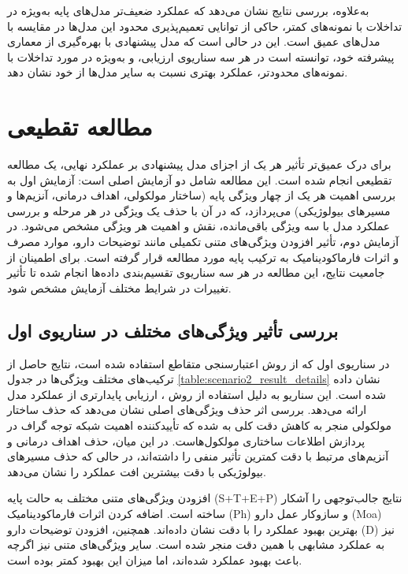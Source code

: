 به‌علاوه، بررسی نتایج نشان می‌دهد که عملکرد ضعیف‌تر مدل‌های پایه به‌ویژه در تداخلات با نمونه‌های کمتر، حاکی از توانایی تعمیم‌پذیری محدود این مدل‌ها در مقایسه با مدل‌های عمیق است. این در حالی است که مدل پیشنهادی با بهره‌گیری از معماری پیشرفته خود، توانسته است در هر سه سناریوی ارزیابی، و به‌ویژه در مورد تداخلات با نمونه‌های محدودتر، عملکرد بهتری نسبت به سایر مدل‌ها از خود نشان دهد.

\section{مطالعه تقطیعی}

برای درک عمیق‌تر تأثیر هر یک از اجزای مدل پیشنهادی بر عملکرد نهایی، یک مطالعه تقطیعی انجام شده است. این مطالعه شامل دو آزمایش اصلی است: آزمایش اول به بررسی اهمیت هر یک از چهار ویژگی پایه (ساختار مولکولی، اهداف درمانی، آنزیم‌ها و مسیرهای بیولوژیکی) می‌پردازد، که در آن با حذف یک ویژگی در هر مرحله و بررسی عملکرد مدل با سه ویژگی باقی‌مانده، نقش و اهمیت هر ویژگی مشخص می‌شود. در آزمایش دوم، تأثیر افزودن ویژگی‌های متنی تکمیلی مانند توضیحات دارو، موارد مصرف و اثرات فارماکودینامیک به ترکیب پایه مورد مطالعه قرار گرفته است. برای اطمینان از جامعیت نتایج، این مطالعه در هر سه سناریوی تقسیم‌بندی داده‌ها انجام شده تا تأثیر تغییرات در شرایط مختلف آزمایش مشخص شود.


\subsection{بررسی تأثیر ویژگی‌های مختلف در سناریوی اول}

در سناریوی اول که از روش اعتبارسنجی متقاطع  استفاده شده است، نتایج حاصل از ترکیب‌های مختلف ویژگی‌ها در جدول \ref{table:scenario2_result_details} نشان داده شده است. این سناریو به دلیل استفاده از روش ، ارزیابی پایدارتری از عملکرد مدل ارائه می‌دهد. بررسی اثر حذف ویژگی‌های اصلی نشان می‌دهد که حذف ساختار مولکولی منجر به کاهش دقت کلی به  شده که تأییدکننده اهمیت شبکه توجه گراف در پردازش اطلاعات ساختاری مولکول‌هاست. در این میان، حذف اهداف درمانی و آنزیم‌های مرتبط با دقت  کمترین تأثیر منفی را داشته‌اند، در حالی که حذف مسیرهای بیولوژیکی با دقت  بیشترین افت عملکرد را نشان می‌دهد.

افزودن ویژگی‌های متنی مختلف به حالت پایه (S+T+E+P) نتایج جالب‌توجهی را آشکار ساخته است. اضافه کردن اثرات فارماکودینامیک (Ph) و سازوکار عمل دارو (Moa) بهترین بهبود عملکرد را با دقت  نشان داده‌اند. همچنین، افزودن توضیحات دارو (D) نیز به عملکرد مشابهی با همین دقت منجر شده است. سایر ویژگی‌های متنی نیز اگرچه باعث بهبود عملکرد شده‌اند، اما میزان این بهبود کمتر بوده است.

